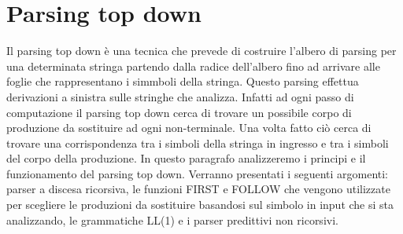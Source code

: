 \section{Parsing top down}
Il parsing top down è una tecnica che prevede di costruire l'albero di parsing per una determinata stringa partendo dalla radice dell'albero fino ad arrivare alle foglie che rappresentano i simmboli della stringa. Questo parsing effettua derivazioni a sinistra sulle stringhe che analizza. Infatti ad ogni passo di computazione il parsing top down cerca di trovare un possibile corpo di produzione da sostituire ad ogni non-terminale. Una volta fatto ciò cerca di trovare una corrispondenza tra i simboli della stringa in ingresso e tra i simboli del corpo della produzione. In questo paragrafo analizzeremo i principi e il funzionamento del parsing top down. Verranno presentati i seguenti argomenti: parser a discesa ricorsiva, le funzioni FIRST e FOLLOW che vengono utilizzate per scegliere le produzioni da sostituire basandosi sul simbolo in input che si sta analizzando, le grammatiche LL(1) e i parser predittivi non ricorsivi.
